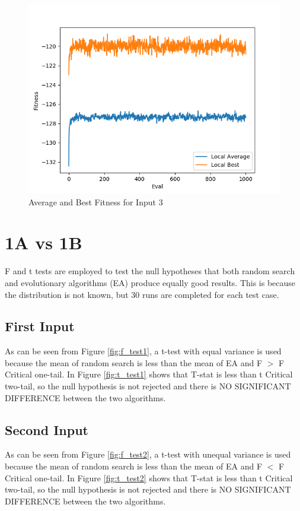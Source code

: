 \documentclass[times]{article}
\begin{document}
	\begin{figure}
		\caption{Average and Best Fitness for Input 3}
		\label{fig:graph_3}
		\includegraphics[width=\textwidth]{../graphs/3.png}
	\end{figure}

	\section{1A vs 1B}
	F and t tests are employed to test the null hypotheses that both random search and evolutionary algorithms (EA) produce equally good results. This is because the distribution is not known, but 30 runs are completed for each test case.

	\subsection{First Input}
	As can be seen from Figure \ref{fig:f_test1}, a t-test with equal variance is used because the mean of random search is less than the mean of EA and F $>$ F Critical one-tail. In Figure \ref{fig:t_test1} shows that T-stat is less than t Critical two-tail, so the null hypothesis is not rejected and there is NO SIGNIFICANT DIFFERENCE between the two algorithms.

	\subsection{Second Input}
	As can be seen from Figure \ref{fig:f_test2}, a t-test with unequal variance is used because the mean of random search is less than the mean of EA and F $<$ F Critical one-tail. In Figure \ref{fig:t_test2} shows that T-stat is less than t Critical two-tail, so the null hypothesis is not rejected and there is NO SIGNIFICANT DIFFERENCE between the two algorithms.
\end{document}
